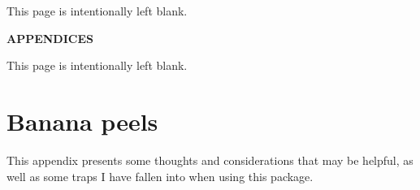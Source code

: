 \documentclass[12pt]{article}
\newcommand{\pstyle}{plain}
\newcommand{\pb}{\strut \vfill \pagebreak}
\newcommand{\bpage}{\vfill \pagebreak \strut

\vspace{2.5in} \centerline{This page is intentionally left blank.}}
\newcommand{\bpagea}{\strut

\vspace{2.5in} \centerline{This page is intentionally left blank.}}
\newcommand{\newsec}{\setcounter{equation}{0}
                      \setcounter{myfigno}{0}
                      \setcounter{mytabno}{0}}
\newcounter{myfigno}[section]
\newcounter{mytabno}[section]
\begin{document}
\pb
\setcounter{footnote}{0}




\pb
\pagestyle{empty}
\bpagea

\pb \strut
\pagestyle{empty}


\vspace{2.5in} \centerline{\large \bf APPENDICES}
\appendix
{}

\bpage
\pb \newsec \setcounter{page}{1} \pagestyle{\pstyle}
\renewcommand{\thepage}{\thesection.\arabic{page}}
\section{Banana peels} \label{app:hints}

\noindent
This appendix presents some thoughts and considerations that may be helpful,
as well as some traps I have fallen into when using this package. 
\end{document}
